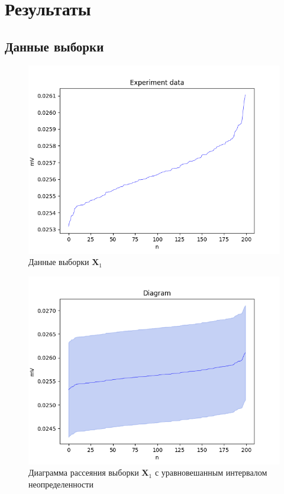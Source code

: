 \section{Результаты}

\subsection{Данные выборки}
 
\begin{figure}[H]
	\begin{center}
		\includegraphics[scale = 0.55]{data.png}
	\end{center}
	\caption{Данные выборки $\bm{X}_1$}
\end{figure}

\begin{figure}[H]
	\begin{center}
		\includegraphics[scale = 0.55]{diagram_beta_None.png}
	\end{center}
	\caption{Диаграмма рассеяния выборки $\bm{X}_1$ с уравновешанным интервалом неопределенности}
\end{figure}

